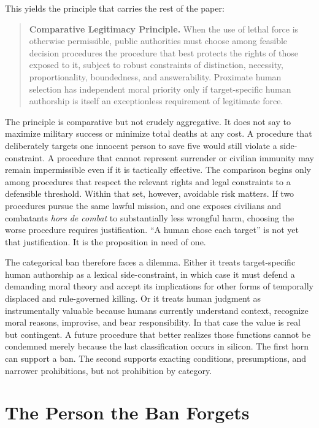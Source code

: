 \documentclass[11pt]{article}
\begin{document}
This yields the principle that carries the rest of the paper:

\begin{quote}
\textbf{Comparative Legitimacy Principle.} When the use of lethal force is otherwise permissible, public authorities must choose among feasible decision procedures the procedure that best protects the rights of those exposed to it, subject to robust constraints of distinction, necessity, proportionality, boundedness, and answerability. Proximate human selection has independent moral priority only if target-specific human authorship is itself an exceptionless requirement of legitimate force.
\end{quote}

The principle is comparative but not crudely aggregative. It does not say to maximize military success or minimize total deaths at any cost. A procedure that deliberately targets one innocent person to save five would still violate a side-constraint. A procedure that cannot represent surrender or civilian immunity may remain impermissible even if it is tactically effective. The comparison begins only among procedures that respect the relevant rights and legal constraints to a defensible threshold. Within that set, however, avoidable risk matters. If two procedures pursue the same lawful mission, and one exposes civilians and combatants \emph{hors de combat} to substantially less wrongful harm, choosing the worse procedure requires justification. ``A human chose each target'' is not yet that justification. It is the proposition in need of one.

The categorical ban therefore faces a dilemma. Either it treats target-specific human authorship as a lexical side-constraint, in which case it must defend a demanding moral theory and accept its implications for other forms of temporally displaced and rule-governed killing. Or it treats human judgment as instrumentally valuable because humans currently understand context, recognize moral reasons, improvise, and bear responsibility. In that case the value is real but contingent. A future procedure that better realizes those functions cannot be condemned merely because the last classification occurs in silicon. The first horn can support a ban. The second supports exacting conditions, presumptions, and narrower prohibitions, but not prohibition by category.

\section{The Person the Ban Forgets}
\label{sec:forgotten}
\end{document}
